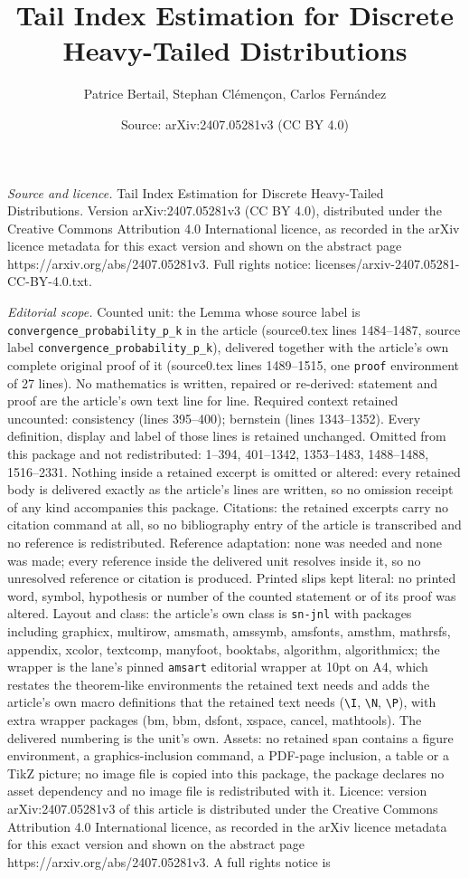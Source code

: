 \documentclass[10pt,a4paper]{amsart}
\title[Tail Index Estimation for Discrete Heavy-Tailed Distribution]{Tail Index Estimation for Discrete Heavy-Tailed Distributions}
\author{Patrice Bertail, Stephan Cl\'emen\c{c}on, Carlos Fern\'andez}
\date{Source: arXiv:2407.05281v3 (CC BY 4.0)}
\begin{document}
\maketitle

\noindent\emph{Source and licence.} Tail Index Estimation for Discrete Heavy-Tailed Distributions. Version arXiv:2407.05281v3 (CC BY 4.0), distributed under the Creative Commons Attribution 4.0 International licence, as recorded in the arXiv licence metadata for this exact version and shown on the abstract page https://arxiv.org/abs/2407.05281v3. Full rights notice: licenses/arxiv-2407.05281-CC-BY-4.0.txt.\par\smallskip

\noindent\textit{Editorial scope.} Counted unit: the Lemma whose source label is \texttt{convergence\_probability\_p\_k} in the article (source0.tex lines 1484--1487, source label \texttt{convergence\_probability\_p\_k}), delivered together with the article's own complete original proof of it (source0.tex lines 1489--1515, one \texttt{proof} environment of 27 lines). No mathematics is written, repaired or re-derived: statement and proof are the article's own text line for line. Required context retained uncounted: consistency (lines 395--400); bernstein (lines 1343--1352). Every definition, display and label of those lines is retained unchanged. Omitted from this package and not redistributed: 1--394, 401--1342, 1353--1483, 1488--1488, 1516--2331. Nothing inside a retained excerpt is omitted or altered: every retained body is delivered exactly as the article's lines are written, so no omission receipt of any kind accompanies this package. Citations: the retained excerpts carry no citation command at all, so no bibliography entry of the article is transcribed and no reference is redistributed. Reference adaptation: none was needed and none was made; every reference inside the delivered unit resolves inside it, so no unresolved reference or citation is produced. Printed slips kept literal: no printed word, symbol, hypothesis or number of the counted statement or of its proof was altered. Layout and class: the article's own class is \texttt{sn-jnl} with packages including graphicx, multirow, amsmath, amssymb, amsfonts, amsthm, mathrsfs, appendix, xcolor, textcomp, manyfoot, booktabs, algorithm, algorithmicx; the wrapper is the lane's pinned \texttt{amsart} editorial wrapper at 10pt on A4, which restates the theorem-like environments the retained text needs and adds the article's own macro definitions that the retained text needs (\texttt{\textbackslash I}, \texttt{\textbackslash N}, \texttt{\textbackslash P}), with extra wrapper packages (bm, bbm, dsfont, xspace, cancel, mathtools). The delivered numbering is the unit's own. Assets: no retained span contains a figure environment, a graphics-inclusion command, a PDF-page inclusion, a table or a TikZ picture; no image file is copied into this package, the package declares no asset dependency and no image file is redistributed with it. Licence: version arXiv:2407.05281v3 of this article is distributed under the Creative Commons Attribution 4.0 International licence, as recorded in the arXiv licence metadata for this exact version and shown on the abstract page https://arxiv.org/abs/2407.05281v3. A full rights notice is 
\end{document}
